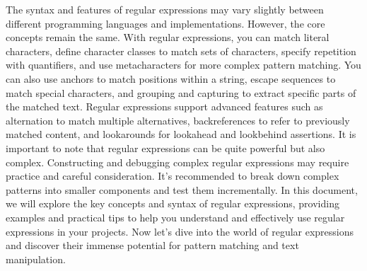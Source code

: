 \documentclass{report}
\begin{document}
    \bigbreak \noindent 
    The syntax and features of regular expressions may vary slightly between different programming languages and implementations. However, the core concepts remain the same.
    \bigbreak \noindent 
    With regular expressions, you can match literal characters, define character classes to match sets of characters, specify repetition with quantifiers, and use metacharacters for more complex pattern matching. You can also use anchors to match positions within a string, escape sequences to match special characters, and grouping and capturing to extract specific parts of the matched text.
    \bigbreak \noindent 
    Regular expressions support advanced features such as alternation to match multiple alternatives, backreferences to refer to previously matched content, and lookarounds for lookahead and lookbehind assertions.
    \bigbreak \noindent 
    It is important to note that regular expressions can be quite powerful but also complex. Constructing and debugging complex regular expressions may require practice and careful consideration. It's recommended to break down complex patterns into smaller components and test them incrementally.
    \bigbreak \noindent 
    In this document, we will explore the key concepts and syntax of regular expressions, providing examples and practical tips to help you understand and effectively use regular expressions in your projects.
    \bigbreak \noindent 
    Now let's dive into the world of regular expressions and discover their immense potential for pattern matching and text manipulation.
\end{document}
